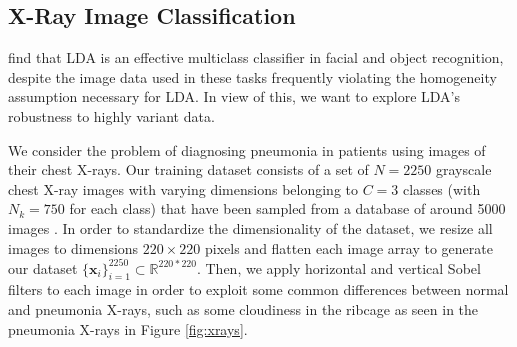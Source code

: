 \documentclass[letterpaper, 10 pt, conference]{ieeeconf}  %
\newcommand{\ve}[1]{\mathbf{#1}}
\begin{document}
\subsection{X-Ray Image Classification}
\citeauthor{lietal} \autocite{lietal} find that LDA is an effective multiclass classifier in facial and object recognition, despite the image data used in these tasks frequently violating the homogeneity assumption necessary for LDA.
In view of this, we want to explore LDA's robustness to highly variant data.

We consider the problem of diagnosing pneumonia in patients using images of their chest X-rays. Our training dataset consists of a set of $N=2250$ grayscale chest X-ray images with varying dimensions belonging to $C=3$ classes (with $N_k=750$ for each class) that have been sampled from a database of around 5000 images \autocite{kermanyetal2018}. In order to standardize the dimensionality of the dataset, we resize all images to dimensions $220\times 220$ pixels and flatten each image array to generate our dataset $\{\ve{x}_i\}_{i=1}^{2250} \subset \mathbb{R}^{220*220}$. Then, we apply horizontal and vertical Sobel filters to each image in order to exploit some common differences between normal and pneumonia X-rays, such as some cloudiness in the ribcage as seen in the pneumonia X-rays in Figure \ref{fig:xrays}.
\end{document}
